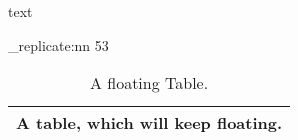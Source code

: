 \documentclass{article}
\newcommand{\floattest}{%
  \begin{table}[t]\centering%
    \begin{tabular}{|l|}%
      \hline%
      A table, which will keep floating.\\%
      \hline
    \end{tabular}%
    \caption{A floating Table.}%
  \end{table}%
  }
\begin{document}
text

\ExplSyntaxOn
\prg_replicate:nn { 53 } { \floattest } %
\ExplSyntaxOff
\end{document}
